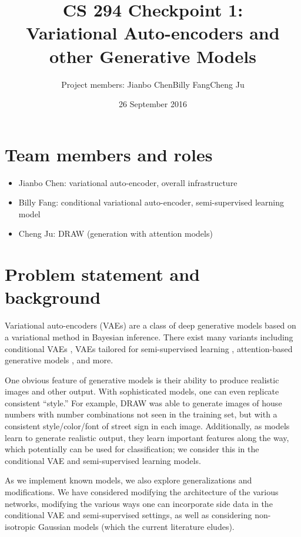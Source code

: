 \documentclass[11pt]{article}
\title{CS 294 Checkpoint 1:\\Variational Auto-encoders and other Generative Models}
\date{26 September 2016}
\author{Project members: Jianbo Chen\quad Billy Fang\quad Cheng Ju}
\begin{document}
\maketitle


\section*{Team members and roles}

\begin{itemize}
    \item Jianbo Chen: variational auto-encoder, overall infrastructure
    \item Billy Fang: conditional variational auto-encoder, semi-supervised learning model
    \item Cheng Ju: DRAW (generation with attention models)
\end{itemize}

\section*{Problem statement and background}

Variational auto-encoders (VAEs) \cite{kingma2013auto} are a class of deep generative models based on a variational method in Bayesian inference. There exist many variants including conditional VAEs \cite{doersch2016tutorial}, VAEs tailored for semi-supervised learning \cite{DBLP:journals/corr/KingmaRMW14}, attention-based generative models \cite{gregor2015draw}, and more.

One obvious feature of generative models is their ability to produce realistic images and other output. With sophisticated models, one can even replicate consistent ``style.'' For example, DRAW \cite{gregor2015draw} was able to generate images of house numbers with number combinations not seen in the training set, but with a consistent style/color/font of street sign in each image. Additionally, as models learn to generate realistic output, they learn important features along the way, which potentially can be used for classification; we consider this in the conditional VAE and semi-supervised learning models.

As we implement known models, we also explore generalizations and modifications. We have considered modifying the architecture of the various networks, modifying the various ways one can incorporate side data in the conditional VAE and semi-supervised settings, as well as considering non-isotropic Gaussian models (which the current literature eludes).
\end{document}
